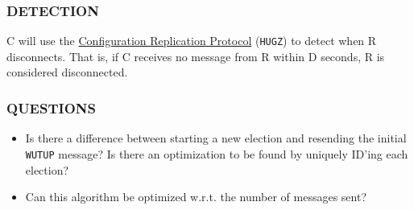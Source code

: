\subsubsection{DETECTION}

C will use the \hyperref[proto_config]{Configuration Replication Protocol} (\texttt{HUGZ}) to detect when R disconnects.
That is, if C receives no message from R within D seconds, R is considered disconnected.

\subsubsection{QUESTIONS}

\begin{itemize}
\item Is there a difference between starting a new election and resending the initial \texttt{WUTUP} message? Is there
      an optimization to be found by uniquely ID'ing each election?
\item Can this algorithm be optimized w.r.t. the number of messages sent?
\end{itemize}
